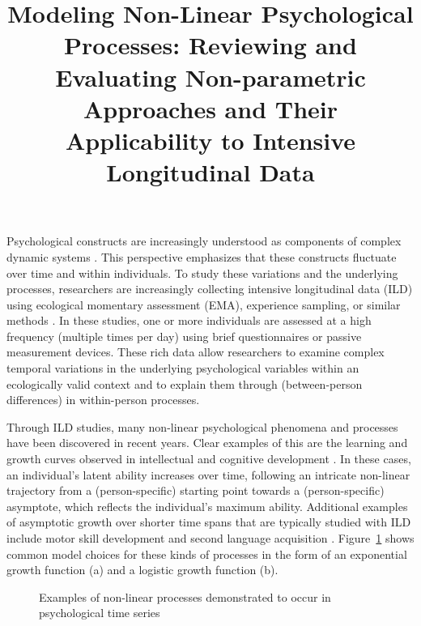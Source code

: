 \documentclass[man, floatsintext]{apa7}
\title{Modeling Non-Linear Psychological Processes: Reviewing and Evaluating
  Non-parametric Approaches and Their Applicability to Intensive
  Longitudinal Data}
\begin{document}
\maketitle

Psychological constructs are increasingly understood as components of complex
dynamic systems \parencite{nesselroade_studying_2004, wang_investigating_2012}.
This perspective emphasizes that these constructs fluctuate over time and
within individuals. To study these variations and the underlying processes,
researchers are increasingly collecting intensive longitudinal data (ILD) using
ecological momentary assessment (EMA), experience sampling, or similar methods
\parencite{fritz_so_2023}. In these studies, one or more individuals are
assessed at a high frequency (multiple times per day) using brief
questionnaires or passive measurement devices. These rich data allow
researchers to examine complex temporal variations in the underlying
psychological variables within an ecologically valid context and to explain
them through (between-person differences) in within-person processes.

Through ILD studies, many non-linear psychological phenomena and processes
have been discovered in recent years. Clear examples of this are the
learning and growth curves observed in intellectual and cognitive development
\parencite{kunnen_dynamic_2012, mcardle_comparative_2002}. In these cases, an
individual's latent ability increases over time, following an intricate
non-linear trajectory from a (person-specific) starting point towards a
(person-specific) asymptote, which reflects the individual's maximum ability.
Additional examples of asymptotic growth over shorter time spans that are
typically studied with ILD include motor skill development
\parencite{newell_time_2001} and second language acquisition
\parencite{de_bot_dynamic_2007}. Figure~\ref{fig:examplar_npn} shows
common model choices for these kinds of processes in the form of an
exponential growth function (a) and a logistic growth function (b).

\begin{figure}[!t]
  \caption{Examples of non-linear processes demonstrated to occur in
    psychological time series}
  \label{fig:examplar_npn}
\end{figure}
\end{document}
